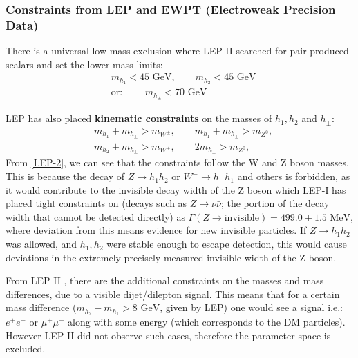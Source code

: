 \documentclass[12pt]{article}
\begin{document}
\subsubsection{Constraints from LEP and EWPT (Electroweak Precision Data)}
There is a universal low-mass exclusion where LEP-II searched for pair produced scalars and set the lower mass limits:
\begin{equation}
    \begin{split}
        &m_{h_1} < 45  \text{ GeV}, \qquad m_{h_2} < 45 \text{ GeV}
         \\ &\text{or: } \qquad m_{h_\pm} <70 \text{ GeV}
    \end{split}
    \label{LEP-1}
\end{equation}

LEP has also placed \textbf{kinematic constraints} on the masses of $h_1, h_2$ and  $h_\pm$:
\begin{equation}
    \begin{split}
        &m_{h_1} + m_{h_\pm} > m_{W^\pm}, \qquad m_{h_1} + m_{h_\pm} > m_{Z^0},
        \\&m_{h_2} + m_{h_\pm} > m_{W^\pm}, \qquad 2m_{h_\pm} > m_{Z^0}, 
    \end{split}
\label{LEP-2}
\end{equation}
From \ref{LEP-2}, we can see that the constraints follow the W and Z boson masses. This is because the decay of $Z \rightarrow h_1h_2$ or $W^- \rightarrow h_-h_1$ and others is forbidden, as it would contribute to the invisible decay width of the Z boson which LEP-I has placed tight constraints on (decays such as $Z\rightarrow \nu \bar{\nu}$; the portion of the decay width that cannot be detected directly) as $\Gamma(Z\rightarrow \text{invisible}) = 499.0 \pm 1.5 \text{ MeV}$, where deviation from this means evidence for new invisible particles. If $Z \rightarrow h_1h_2$ was allowed, and $ h_1,h_2$ were stable enough to escape detection, this would cause deviations in the extremely precisely measured invisible width of the Z boson.

From LEP II \cite{Lundstr_m_2009}, there are the additional constraints on the masses and mass differences, due to a visible dijet/dilepton signal. This means that for a certain mass difference ($m_{h_2} - m_{h_1} > 8\text{ GeV}$, given by LEP) one would see a signal i.e.: $e^+e^-$ or $\mu^+ \mu^-$ along with some energy (which corresponds to the DM particles). However LEP-II did not observe such cases, therefore the parameter space is excluded. 
\end{document}
